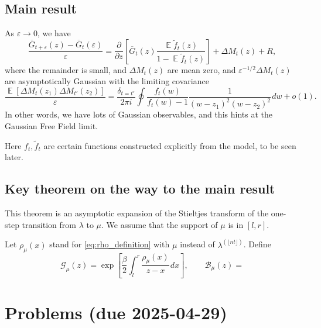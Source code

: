 \documentclass[letterpaper,11pt,oneside,reqno]{article}
\numberwithin{equation}{section}
\newcommand{\ssp}{\hspace{1pt}}
\theoremstyle{definition}
\begin{document}
\subsection{Main result \cite[Section~6]{gorin2022dynamical}}

As $\varepsilon\to0$, we have
\begin{equation*}
	\frac{\overline G_{t+\varepsilon}(z)-\overline G_t(\varepsilon)}{\varepsilon}
	=
	\frac{\partial}{\partial z}\left[
		\overline
		G_t(z)\frac{\operatorname{\mathbb{E}}\tilde f_t(z)}{1-\operatorname{\mathbb{E}}\tilde f_t(z)}
	\right]+
	\Delta M_t(z)+R,
\end{equation*}
where the remainder is small, and $\Delta M_t(z)$ are mean zero,
and $\varepsilon^{-1/2}\Delta M_t(z)$ are asymptotically Gaussian with the limiting covariance
\begin{equation*}
	\frac{\operatorname{\mathbb{E}}\left[ \Delta M_t(z_1)\Delta M_{t'}(z_2) \right]}{\varepsilon}
	=
	\frac{\delta_{t=t'}}{2\pi i}\oint
	\frac{f_t(w)}{f_t(w)-1}
	\frac{1}{(w-z_1)^2(w-z_2)^2}\ssp dw+o(1).
\end{equation*}
In other words, we have lots of Gaussian observables, and this hints at the Gaussian Free Field
limit.

Here $f_t,\tilde f_t$ are certain functions constructed explicitly from the model, to be seen later.

\subsection{Key theorem on the way to the main result \cite[Theorem~4.5]{gorin2022dynamical}}

This theorem is an asymptotic expansion of the Stieltjes transform
of the one-step transition from $\lambda$ to $\mu$.
We assume that the support of $\mu$ is in $[l,r]$.

Let $\rho_\mu(x)$ stand for \eqref{eq:rho_definition} with $\mu$ instead of $\lambda^{(\lfloor nt \rfloor )}$. Define
\begin{equation*}
	\mathcal{G}_\mu(z)=\exp\left[ \frac{\beta}{2}\int_{l}^{r} \frac{\rho_\mu(x)}{z-x}\ssp dx\right],
	\qquad 
	\mathcal{B}_\mu(z)=
\end{equation*}






\appendix
\setcounter{section}{8}

\section{Problems (due 2025-04-29)}
\end{document}
